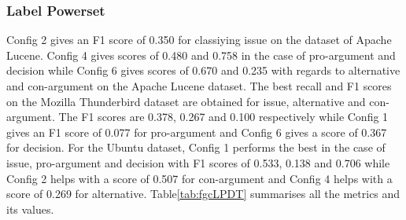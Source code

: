\documentclass[a4paper,12pt,twoside]{report}
\begin{document}
\subsubsection{Label Powerset}
Config 2 gives an F1 score of 0.350 for classiying issue on the dataset of Apache Lucene. Config 4 gives scores of 0.480 and 0.758 in the case of pro-argument and decision while Config 6 gives scores of 0.670 and 0.235 with regards to alternative and con-argument on the Apache Lucene dataset. The best recall and F1 scores on the Mozilla Thunderbird dataset are obtained for issue, alternative and con-argument. The F1 scores are 0.378, 0.267 and 0.100 respectively while Config 1 gives an F1 score of 0.077 for pro-argument and Config 6 gives a score of 0.367 for decision. For the Ubuntu dataset, Config 1 performs the best in the case of issue, pro-argument and decision with F1 scores of 0.533, 0.138 and 0.706 while Config 2 helps with a score of 0.507 for con-argument and Config 4 helps with a score of 0.269 for alternative. Table\ref{tab:fgcLPDT} summarises all the metrics and its values.
\end{document}
